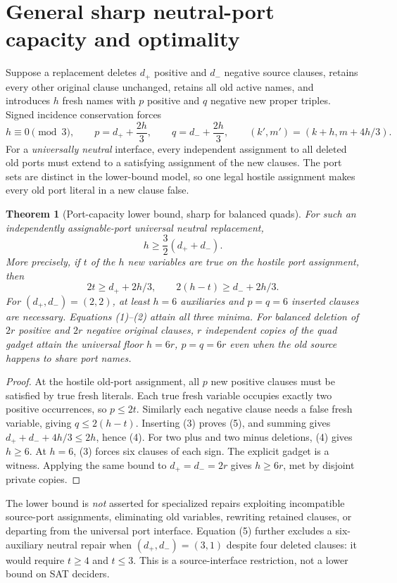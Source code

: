 \documentclass[11pt]{article}
\newtheorem{theorem}{Theorem}
\begin{document}
\section{General sharp neutral-port capacity and optimality}
Suppose a replacement deletes \(d_+\) positive and \(d_-\) negative source clauses, retains every other original clause unchanged, retains all old active names, and introduces \(h\) fresh names with \(p\) positive and \(q\) negative new proper triples. Signed incidence conservation forces
\[
\boxed{h\equiv0\pmod3,\qquad
p=d_++\frac{2h}{3},\qquad q=d_-+\frac{2h}{3},\qquad
(k',m')=(k+h,m+4h/3).}\tag{3}
\]
For a \emph{universally neutral} interface, every independent assignment to all deleted old ports must extend to a satisfying assignment of the new clauses. The port sets are distinct in the lower-bound model, so one legal hostile assignment makes every old port literal in a new clause false.

\begin{theorem}[Port-capacity lower bound, sharp for balanced quads]
For such an independently assignable-port universal neutral replacement,
\[
\boxed{h\ge \frac32(d_++d_-).}\tag{4}
\]
More precisely, if \(t\) of the \(h\) new variables are true on the hostile port assignment, then
\[
\boxed{
2t\ge d_++2h/3,\qquad
2(h-t)\ge d_-+2h/3.}\tag{5}
\]
For \((d_+,d_-)=(2,2)\), at least \(h=6\) auxiliaries and \(p=q=6\) inserted clauses are necessary. Equations (1)--(2) attain all three minima. For balanced deletion of \(2r\) positive and \(2r\) negative original clauses, \(r\) independent copies of the quad gadget attain the universal floor \(h=6r\), \(p=q=6r\) even when the old source happens to share port names.
\end{theorem}
\begin{proof}
At the hostile old-port assignment, all \(p\) new positive clauses must be satisfied by true fresh literals. Each true fresh variable occupies exactly two positive occurrences, so \(p\le2t\). Similarly each negative clause needs a false fresh variable, giving \(q\le2(h-t)\). Inserting (3) proves (5), and summing gives \(d_++d_-+4h/3\le2h\), hence (4). For two plus and two minus deletions, (4) gives \(h\ge6\). At \(h=6\), (3) forces six clauses of each sign. The explicit gadget is a witness. Applying the same bound to \(d_+=d_-=2r\) gives \(h\ge6r\), met by disjoint private copies.
\end{proof}

The lower bound is \emph{not} asserted for specialized repairs exploiting incompatible source-port assignments, eliminating old variables, rewriting retained clauses, or departing from the universal port interface. Equation (5) further excludes a six-auxiliary neutral repair when \((d_+,d_-)=(3,1)\) despite four deleted clauses: it would require \(t\ge4\) and \(t\le3\). This is a source-interface restriction, not a lower bound on SAT deciders.
\end{document}
